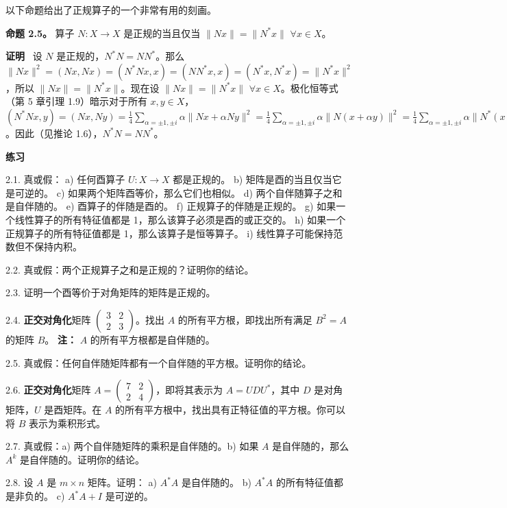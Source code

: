 以下命题给出了正规算子的一个非常有用的刻画。

\textbf{命题 2.5。} 算子 $N: X \to X$ 是正规的当且仅当 $\|Nx\| = \|N^*x\|$ $\forall x \in X$。

\textbf{证明}~ 设 $N$ 是正规的，$N^*N = NN^*$。那么 $\|Nx\|^2 = (Nx, Nx) = (N^*Nx, x) = (NN^*x, x) = (N^*x, N^*x) = \|N^*x\|^2$，所以 $\|Nx\| = \|N^*x\|$。现在设 $\|Nx\| = \|N^*x\|$ $\forall x \in X$。极化恒等式（第 5 章引理 1.9）暗示对于所有 $x, y \in X$，$(N^*Nx, y) = (Nx, Ny) = \frac{1}{4} \sum_{\alpha = \pm 1, \pm i} \alpha \|Nx + \alpha Ny\|^2 = \frac{1}{4} \sum_{\alpha = \pm 1, \pm i} \alpha \|N(x + \alpha y)\|^2 = \frac{1}{4} \sum_{\alpha = \pm 1, \pm i} \alpha \|N^*(x + \alpha y)\|^2 = (N^*x, N^*y) = (NN^*x, y)$。因此（见推论 1.6），$N^*N = NN^*$。

\textbf{练习}~

2.1. 真或假：
a) 任何酉算子 $U: X \to X$ 都是正规的。
b) 矩阵是酉的当且仅当它是可逆的。
c) 如果两个矩阵酉等价，那么它们也相似。
d) 两个自伴随算子之和是自伴随的。
e) 酉算子的伴随是酉的。
f) 正规算子的伴随是正规的。
g) 如果一个线性算子的所有特征值都是 1，那么该算子必须是酉的或正交的。
h) 如果一个正规算子的所有特征值都是 1，那么该算子是恒等算子。
i) 线性算子可能保持范数但不保持内积。

2.2. 真或假：两个正规算子之和是正规的？证明你的结论。

2.3. 证明一个酉等价于对角矩阵的矩阵是正规的。

2.4. \textbf{正交对角化}矩阵 $\begin{pmatrix} 3 & 2 \\ 2 & 3 \end{pmatrix}$。找出 $A$ 的所有平方根，即找出所有满足 $B^2 = A$ 的矩阵 $B$。
\textbf{注：} $A$ 的所有平方根都是自伴随的。




2.5. 真或假：任何自伴随矩阵都有一个自伴随的平方根。证明你的结论。

2.6. \textbf{正交对角化}矩阵 $A = \begin{pmatrix} 7 & 2 \\ 2 & 4 \end{pmatrix}$，即将其表示为 $A = UDU^*$，其中 $D$ 是对角矩阵，$U$ 是酉矩阵。在 $A$ 的所有平方根中，找出具有正特征值的平方根。你可以将 $B$ 表示为乘积形式。

2.7. 真或假：a) 两个自伴随矩阵的乘积是自伴随的。b) 如果 $A$ 是自伴随的，那么 $A^k$ 是自伴随的。证明你的结论。

2.8. 设 $A$ 是 $m \times n$ 矩阵。证明：
a) $A^*A$ 是自伴随的。
b) $A^*A$ 的所有特征值都是非负的。
c) $A^*A + I$ 是可逆的。

